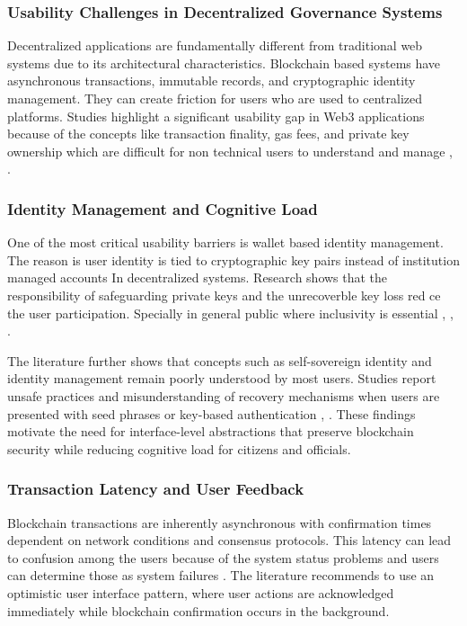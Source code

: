 \subsubsection{Usability Challenges in Decentralized Governance Systems}

Decentralized applications are fundamentally different from traditional web systems due to its architectural characteristics. Blockchain based systems have asynchronous transactions, immutable records, and cryptographic identity management. They can create friction for users who are used to centralized platforms. Studies highlight a significant usability gap in Web3 applications because of the concepts like transaction finality, gas fees, and private key ownership which are difficult for non technical users to understand and manage  \cite{mdpi2025usercentric}, \cite{sonule2025uxweb3}.

\subsubsection{Identity Management and Cognitive Load}

One of the most critical usability barriers is wallet based identity management. The reason is user identity is tied to cryptographic key pairs instead of institution managed accounts In decentralized systems. Research shows that the responsibility of safeguarding private keys and the unrecoverble key loss red ce the user participation. Specially in general public where inclusivity is essential \cite{sonule2025uxweb3}, \cite{ramotion2026uiux}, \cite{fintechweekly2025usability}.  

The literature further shows that concepts such as self-sovereign identity and identity management remain poorly understood by most users. Studies report unsafe practices and misunderstanding of recovery mechanisms when users are presented with seed phrases or key-based authentication \cite{oup2022governance}, \cite{fraunhofer2026usability}. These findings motivate the need for interface-level abstractions that preserve blockchain security while reducing cognitive load for citizens and officials.

\subsubsection{Transaction Latency and User Feedback}

Blockchain transactions are inherently asynchronous with confirmation times dependent on network conditions and consensus protocols. This latency can lead to confusion among  the users because of the system status problems and users can determine those as system failures \cite{sonule2025uxweb3}. The literature recommends to use an optimistic user interface pattern, where user actions are acknowledged immediately while blockchain confirmation occurs in the background.  

